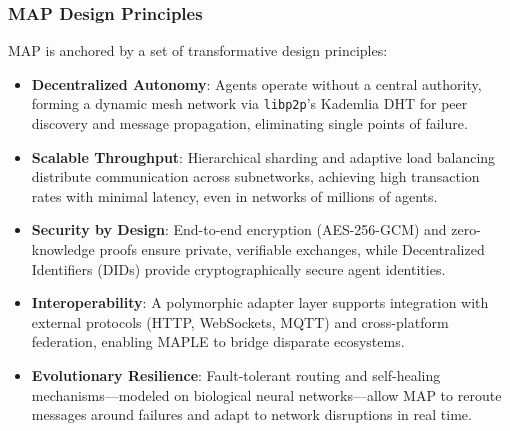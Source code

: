 \documentclass[a4paper,11pt]{article}
\begin{document}
\subsubsection{MAP Design Principles}
MAP is anchored by a set of transformative design principles:
\begin{itemize}[leftmargin=*]
    \item \textbf{Decentralized Autonomy}: Agents operate without a central authority, forming a dynamic mesh network via \texttt{libp2p}’s Kademlia DHT for peer discovery and message propagation, eliminating single points of failure.
    \item \textbf{Scalable Throughput}: Hierarchical sharding and adaptive load balancing distribute communication across subnetworks, achieving high transaction rates with minimal latency, even in networks of millions of agents.
    \item \textbf{Security by Design}: End-to-end encryption (AES-256-GCM) and zero-knowledge proofs ensure private, verifiable exchanges, while Decentralized Identifiers (DIDs) provide cryptographically secure agent identities.
    \item \textbf{Interoperability}: A polymorphic adapter layer supports integration with external protocols (HTTP, WebSockets, MQTT) and cross-platform federation, enabling MAPLE to bridge disparate ecosystems.
    \item \textbf{Evolutionary Resilience}: Fault-tolerant routing and self-healing mechanisms—modeled on biological neural networks—allow MAP to reroute messages around failures and adapt to network disruptions in real time.
\end{itemize}
\end{document}
